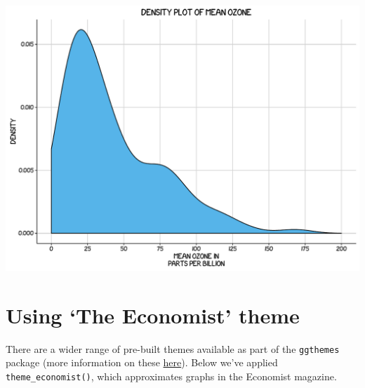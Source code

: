 \begin{center}\includegraphics[width=0.55\linewidth]{figures/density_10-1} \end{center}

\section{\texorpdfstring{Using `The Economist'
theme}{Using The Economist theme}}\label{using-the-economist-theme-7}

There are a wider range of pre-built themes available as part of the
\texttt{ggthemes} package (more information on these
\href{https://cran.r-project.org/web/packages/ggthemes/vignettes/ggthemes.html}{here}).
Below we've applied \texttt{theme\_economist()}, which approximates
graphs in the Economist magazine.

